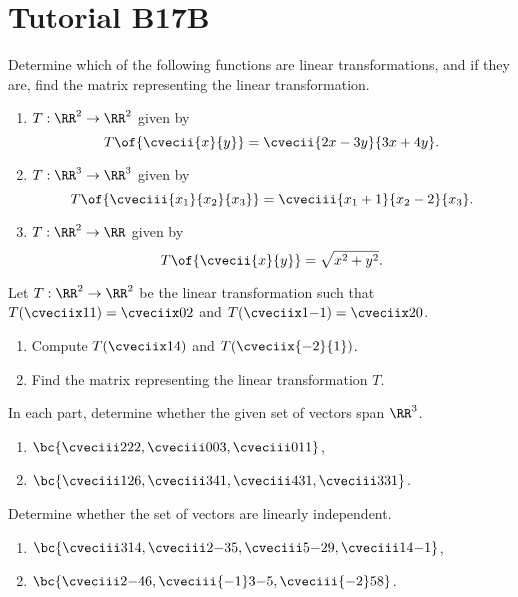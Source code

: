 \section{Tutorial B17B}

\begin{problem}
    Determine which of the following functions are linear transformations, and if they are, find the matrix representing the linear transformation.

    \begin{enumerate}
        \item $T : \RR^2 \to \RR^2$ given by \[T\of{\cvecii{x}{y}} = \cvecii{2x-3y}{3x+4y}.\]
        \item $T : \RR^3 \to \RR^3$ given by \[T\of{\cveciii{x_1}{x_2}{x_3}} = \cveciii{x_1+1}{x_2-2}{x_3}.\]
        \item $T : \RR^2 \to \RR$ given by \[T\of{\cvecii{x}{y}} = \sqrt{x^2 + y^2}.\]
    \end{enumerate}
\end{problem}

\begin{problem}
    Let $T : \RR^2 \to \RR^2$ be the linear transformation such that $T(\cveciix11) = \cveciix02$ and $T(\cveciix1{-1}) = \cveciix20$.

    \begin{enumerate}
        \item Compute $T(\cveciix14)$ and $T(\cveciix{-2}{1})$.
        \item Find the matrix representing the linear transformation $T$.
    \end{enumerate}
\end{problem}

\begin{problem}
    In each part, determine whether the given set of vectors span $\RR^3$.

    \begin{enumerate}
        \item $\bc{\cveciii222, \cveciii003, \cveciii011}$,
        \item $\bc{\cveciii126, \cveciii341, \cveciii431, \cveciii331}$.
    \end{enumerate}
\end{problem}

\begin{problem}
    Determine whether the set of vectors are linearly independent.

    \begin{enumerate}
        \item $\bc{\cveciii314, \cveciii2{-3}5, \cveciii5{-2}{9}, \cveciii14{-1}}$,
        \item $\bc{\cveciii2{-4}6, \cveciii{-1}3{-5}, \cveciii{-2}58}$.
    \end{enumerate}
\end{problem}

